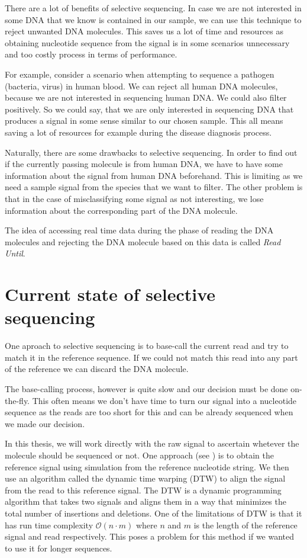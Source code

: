 There are a lot of benefits of selective sequencing. In case we are not interested
in some DNA that we know is contained in our sample, we can use this technique to
reject unwanted DNA molecules. This saves us a lot of time and resources as obtaining
nucleotide sequence from the signal is in some scenarios unnecessary and too
costly process in terms of performance.

For example, consider a scenario when attempting to sequence a pathogen (bacteria, virus) in human blood. We can
reject all human DNA molecules, because we are not interested in sequencing human
DNA. We could also filter positively. So we could say, that we are only
interested in sequencing DNA that produces a signal in some sense similar to our
chosen sample. This all means saving a lot of resources for example during the disease diagnosis process.

Naturally, there are some drawbacks to selective sequencing. In order to find out
if the currently passing molecule is from human DNA, we have to have some information
about the signal from human DNA beforehand. This is limiting as we need a sample signal from
the species that we want to filter. The other problem is that in the case of misclassifying
some signal as not interesting, we lose information about the corresponding
part of the DNA molecule.

The idea of accessing real time data during the phase of reading the DNA molecules
and rejecting the DNA molecule based on this data is called \textit{Read Until}. 

\section{Current state of selective sequencing}


One aproach to selective sequencing is to base-call the current read
and try to match it in the reference sequence. If we could not match this read
into any part of the reference we can discard the DNA molecule.

The base-calling process, however is quite slow and our decision must be done on-the-fly.
This often means we don't have time to turn our signal into a nucleotide sequence
as the reads are too short for this and can be already sequenced when we made our decision.

In this thesis, we will work directly with the raw signal to ascertain whetever the molecule
should be sequenced or not. One approach (see \cite{loose2016real}) is to obtain the reference signal using
simulation from the reference nucleotide string. We then use an algorithm called
the dynamic time warping (DTW) to align the signal from the read to this reference signal.
The DTW is a dynamic programming algorithm that takes two signals and aligns them in a
way that minimizes the total number of insertions and deletions. One of the limitations
of DTW is that it has run time complexity $\mathcal{O}(n\cdot m)$ where $n$ and $m$
is the length of the reference signal and read respectively. This poses a problem
for this method if we wanted to use it for longer sequences.


